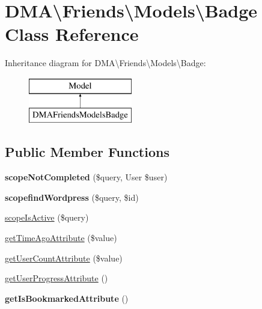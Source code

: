 \hypertarget{classDMA_1_1Friends_1_1Models_1_1Badge}{}\section{D\+M\+A\textbackslash{}Friends\textbackslash{}Models\textbackslash{}Badge Class Reference}
\label{classDMA_1_1Friends_1_1Models_1_1Badge}
Inheritance diagram for D\+M\+A\textbackslash{}Friends\textbackslash{}Models\textbackslash{}Badge\+:\begin{figure}[H]
\begin{center}
\leavevmode
\includegraphics[height=2.000000cm]{df/d98/classDMA_1_1Friends_1_1Models_1_1Badge}
\end{center}
\end{figure}
\subsection*{Public Member Functions}
\begin{DoxyCompactItemize}
\item 
\hypertarget{classDMA_1_1Friends_1_1Models_1_1Badge_a65fc600bfefbedc8d7393ec86c848a51}{}{\bfseries scope\+Not\+Completed} (\$query, User \$user)\label{classDMA_1_1Friends_1_1Models_1_1Badge_a65fc600bfefbedc8d7393ec86c848a51}

\item 
\hypertarget{classDMA_1_1Friends_1_1Models_1_1Badge_a5ebdc91135362ca2b0225fdb0c965127}{}{\bfseries scopefind\+Wordpress} (\$query, \$id)\label{classDMA_1_1Friends_1_1Models_1_1Badge_a5ebdc91135362ca2b0225fdb0c965127}

\item 
\hyperlink{classDMA_1_1Friends_1_1Models_1_1Badge_a77dd406d08ff5c6727ee497e7e7ea5ed}{scope\+Is\+Active} (\$query)
\item 
\hyperlink{classDMA_1_1Friends_1_1Models_1_1Badge_a628b0da2969e586837ad98fecf12ee71}{get\+Time\+Ago\+Attribute} (\$value)
\item 
\hyperlink{classDMA_1_1Friends_1_1Models_1_1Badge_a5e5972aaa2bf8b8458bd6ddff8ebc576}{get\+User\+Count\+Attribute} (\$value)
\item 
\hyperlink{classDMA_1_1Friends_1_1Models_1_1Badge_a3deecf172b12b43e2f0c0bb7c15a00c3}{get\+User\+Progress\+Attribute} ()
\item 
\hypertarget{classDMA_1_1Friends_1_1Models_1_1Badge_a218e9babbcf0db06e0a83e1079e858b2}{}{\bfseries get\+Is\+Bookmarked\+Attribute} ()\label{classDMA_1_1Friends_1_1Models_1_1Badge_a218e9babbcf0db06e0a83e1079e858b2}

\end{DoxyCompactItemize}

